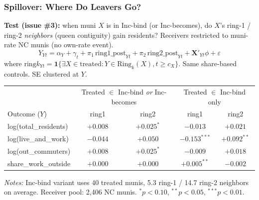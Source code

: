 \documentclass[xcolor = x11names, compress, aspectratio = 169]{beamer}
\begin{document}
    \begin{frame}
    \frametitle{Spillover: Where Do Leavers Go?}
        \footnotesize
        \textbf{Test (issue \#3):} when muni $X$ is in Inc-bind (or Inc-becomes),
        do $X$'s ring-1 / ring-2 \emph{neighbors} (queen contiguity) gain
        residents? Receivers restricted to muni-rate NC munis (no own-rate event).
        \[
            Y_{Yt} = \alpha_Y + \gamma_t + \pi_1\,\text{ring1\_post}_{Yt}
                                     + \pi_2\,\text{ring2\_post}_{Yt}
                                     + \mathbf{X}'_{Yt}\phi + \varepsilon
        \]
        where $\text{ring}k_{Yt}=\mathbf{1}\{\exists X\in \text{treated}: Y\in \text{Ring}_k(X), t\geq c_X\}$.
        Same share-based controls. SE clustered at $Y$.
        \medskip
        \scriptsize
        \renewcommand{\arraystretch}{1.15}
        \setlength{\tabcolsep}{6pt}
        \begin{tabular}{lcc|cc}
            \toprule
            & \multicolumn{2}{c|}{Treated $\in$ Inc-bind \emph{or} Inc-becomes} & \multicolumn{2}{c}{Treated $\in$ Inc-bind only} \\
            Outcome ($Y$) & ring1 & ring2 & ring1 & ring2 \\
            \midrule
            log(total\_residents) & $+0.008$       & $+0.025^{*}$  & $-0.013$           & $+0.021$ \\
            log(live\_and\_work)  & $-0.044$       & $+0.050$      & $\bm{-0.153^{***}}$ & $\bm{+0.092^{**}}$ \\
            log(out\_commuters)   & $+0.008$       & $+0.025^{*}$  & $-0.009$            & $+0.018$ \\
            share\_work\_outside  & $+0.000$       & $+0.000$      & $\bm{+0.005^{**}}$  & $-0.002$ \\
            \bottomrule
        \end{tabular}
        \vspace{0.10cm}
        \begin{minipage}{0.95\textwidth}
            \tiny \textit{Notes:} Inc-bind variant uses 40 treated munis, 5.3 ring-1 / 14.7
            ring-2 neighbors on average. Receiver pool: 2{,}406 NC munis.
            $^{*}p<0.10$, $^{**}p<0.05$, $^{***}p<0.01$.
        \end{minipage}
    \end{frame}
\end{document}
